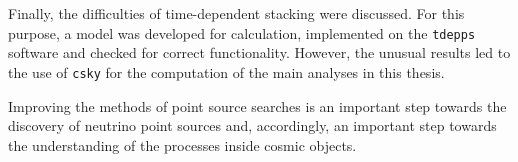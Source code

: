 Finally, the difficulties of time-dependent stacking were discussed.
For this purpose, a model was developed for calculation, implemented on the \texttt{tdepps} software and checked for correct functionality.
However, the unusual results led to the use of \texttt{csky} for the computation of the main analyses in this thesis.

Improving the methods of point source searches is an important step towards the discovery of neutrino point sources and, accordingly, an important step towards the understanding of the processes inside cosmic objects.

%
